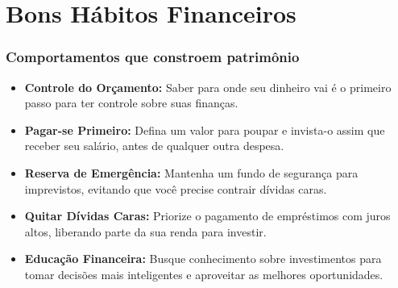 \section{Bons Hábitos Financeiros}

\begin{frame}[c]\frametitle{Comportamentos que constroem patrimônio}
  \begin{itemize}
    \item \textbf{Controle do Orçamento:} Saber para onde seu dinheiro vai é o primeiro passo para ter controle sobre suas finanças.
    \item \textbf{Pagar-se Primeiro:} Defina um valor para poupar e invista-o assim que receber seu salário, antes de qualquer outra despesa.
    \item \textbf{Reserva de Emergência:} Mantenha um fundo de segurança para imprevistos, evitando que você precise contrair dívidas caras.
    \item \textbf{Quitar Dívidas Caras:} Priorize o pagamento de empréstimos com juros altos, liberando parte da sua renda para investir.
    \item \textbf{Educação Financeira:} Busque conhecimento sobre investimentos para tomar decisões mais inteligentes e aproveitar as melhores oportunidades.
  \end{itemize}
\end{frame}